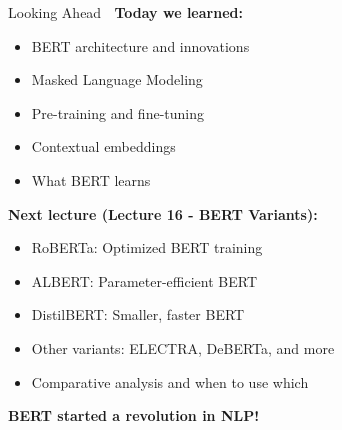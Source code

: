 \documentclass[aspectratio=169]{beamer}
\begin{document}
\begin{frame}[shrink=10]{Looking Ahead 🔮}
\textbf{Today we learned:}
\begin{itemize}\setlength{\itemsep}{0pt}
    \item BERT architecture and innovations
    \item Masked Language Modeling
    \item Pre-training and fine-tuning
    \item Contextual embeddings
    \item What BERT learns
\end{itemize}

\vspace{1em}

\textbf{Next lecture (Lecture 16 - BERT Variants):}
\begin{itemize}\setlength{\itemsep}{0pt}
    \item \alert{RoBERTa}: Optimized BERT training
    \item \alert{ALBERT}: Parameter-efficient BERT
    \item \alert{DistilBERT}: Smaller, faster BERT
    \item \alert{Other variants}: ELECTRA, DeBERTa, and more
    \item Comparative analysis and when to use which
\end{itemize}

\vspace{1em}

\begin{center}
\Large
\textbf{BERT started a revolution in NLP! 🚀}
\end{center}
\end{frame}
\end{document}
